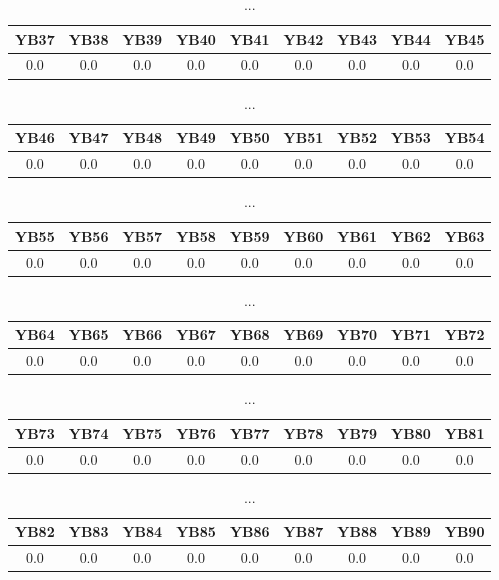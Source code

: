 \documentclass[]{article}
\begin{document}
\begin{table}[h]
	\centering
	\begin{tabular}{|c|c|c|c|c|c|c|c|c|}
		\hline
		YB37 & YB38 & YB39 & YB40 & YB41 & YB42 & YB43 & YB44 & YB45 \\
		\hline
		0.0  & 0.0  & 0.0  & 0.0  & 0.0  & 0.0  & 0.0  & 0.0  & 0.0  \\
		\hline
	\end{tabular}
	\caption{...}
\end{table}
\begin{table}[h]
	\centering
	\begin{tabular}{|c|c|c|c|c|c|c|c|c|}
		\hline
		YB46 & YB47 & YB48 & YB49 & YB50 & YB51 & YB52 & YB53 & YB54 \\
		\hline
		0.0  & 0.0  & 0.0  & 0.0  & 0.0  & 0.0  & 0.0  & 0.0  & 0.0  \\
		\hline
	\end{tabular}
	\caption{...}
\end{table}
\begin{table}[h]
	\centering
	\begin{tabular}{|c|c|c|c|c|c|c|c|c|}
		\hline
		YB55 & YB56 & YB57 & YB58 & YB59 & YB60 & YB61 & YB62 & YB63 \\
		\hline
		0.0  & 0.0  & 0.0  & 0.0  & 0.0  & 0.0  & 0.0  & 0.0  & 0.0  \\
		\hline
	\end{tabular}
	\caption{...}
\end{table}
\begin{table}[h]
	\centering
	\begin{tabular}{|c|c|c|c|c|c|c|c|c|}
		\hline
		YB64 & YB65 & YB66 & YB67 & YB68 & YB69 & YB70 & YB71 & YB72 \\
		\hline
		0.0  & 0.0  & 0.0  & 0.0  & 0.0  & 0.0  & 0.0  & 0.0  & 0.0  \\
		\hline
	\end{tabular}
	\caption{...}
\end{table}
\begin{table}[h]
	\centering
	\begin{tabular}{|c|c|c|c|c|c|c|c|c|}
		\hline
		YB73 & YB74 & YB75 & YB76 & YB77 & YB78 & YB79 & YB80 & YB81 \\
		\hline
		0.0  & 0.0  & 0.0  & 0.0  & 0.0  & 0.0  & 0.0  & 0.0  & 0.0  \\
		\hline
	\end{tabular}
	\caption{...}
\end{table}
\begin{table}[h]
	\centering
	\begin{tabular}{|c|c|c|c|c|c|c|c|c|}
		\hline
		YB82 & YB83 & YB84 & YB85 & YB86 & YB87 & YB88 & YB89 & YB90 \\
		\hline
		0.0  & 0.0  & 0.0  & 0.0  & 0.0  & 0.0  & 0.0  & 0.0  & 0.0  \\
		\hline
	\end{tabular}
	\caption{...}
\end{table}
\end{document}
